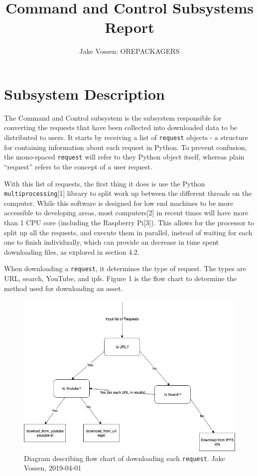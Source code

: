 \documentclass{article}
\begin{document}
\title{Command and Control Subsystems Report}
\author{Jake Vossen: OREPACKAGERS}

\maketitle


\section{Subsystem Description}
The Command and Control subsystem is the subsystem responsible for
converting the requests that have been collected into downloaded data
to be distributed to users. It starts by receiving a list of
\texttt{request} objects - a structure for containing information about
each request in Python. To prevent confusion, the mono-spaced \texttt{request}
will refer to they Python object itself, whereas plain ``request''
refers to the concept of a user request.

With this list of requests, the first thing it does is use the Python
\texttt{multiprocessing}[1] library to split work up between the
different threads on the computer. While this software is designed
for low end machines to be more accessible to developing areas, most
computers[2] in recent times will have more than 1 CPU core (including
the Raspberry Pi[3]). This allows for the processor to split up all
the requests, and execute them in parallel, instead of waiting for each
one to finish individually, which can provide an decrease in time
spent downloading files, as explored in section 4.2.

When downloading a \texttt{request}, it determines the type of
request. The types are URL, search, YouTube, and ipfs. Figure 1 is the
flow chart to determine the method used for downloading an asset.

\begin{figure}[H]
  \centering
  \includegraphics[scale=.5]{log-flow-chart.png}
  \caption{\begingroup \fontsize{10pt}{10pt}\selectfont Diagram describing flow chart of downloading each
    \texttt{request}. Jake Vossen, 2019-04-01 \endgroup
  }
\end{figure}
\end{document}
